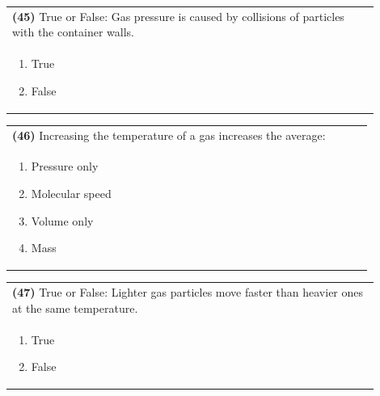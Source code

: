 \documentclass{article}
\begin{document}
{{\newpage

\noindent\begin{tabular}{|p{0.9\linewidth}|}
\hline
\textbf{(45)} True or False: Gas pressure is caused by collisions of particles with the container walls.\\[0.2cm]

\begin{minipage}[t]{0.85\linewidth}
\begin{enumerate}[label=\alph*.]
\item True
\item False
\end{enumerate}
\end{minipage}\\[0.2cm]
\hline
\end{tabular}

\vspace{0.2cm}
\noindent\begin{tabular}{|p{0.9\linewidth}|}
\hline
\textbf{(46)} Increasing the temperature of a gas increases the average:\\[0.2cm]

\begin{minipage}[t]{0.85\linewidth}
\begin{enumerate}[label=\alph*.]
\item Pressure only
\item Molecular speed
\item Volume only
\item Mass
\end{enumerate}
\end{minipage}\\[0.2cm]
\hline
\end{tabular}

\vspace{0.2cm}
\noindent\begin{tabular}{|p{0.9\linewidth}|}
\hline
\textbf{(47)} True or False: Lighter gas particles move faster than heavier ones at the same temperature.\\[0.2cm]

\begin{minipage}[t]{0.85\linewidth}
\begin{enumerate}[label=\alph*.]
\item True
\item False
\end{enumerate}
\end{minipage}\\[0.2cm]
\hline
\end{tabular}

}}
\end{document}

